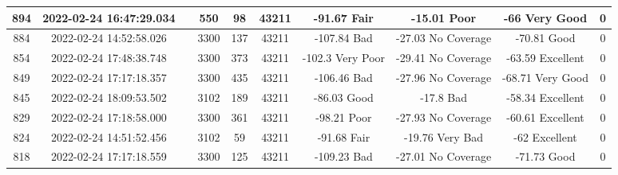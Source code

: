 \begin{longtable*}{|c|c|c|c|c|c|c|c|c|c|}
894&2022-02-24 16:47:29.034&&550&98&43211& -91.67    Fair        & -15.01    Poor        & -66       Very Good   & 0\\\hline
{}884&2022-02-24 14:52:58.026&&3300&137&43211& -107.84   Bad         & -27.03    No Coverage & -70.81    Good        & 0\\\hline
{}854&2022-02-24 17:48:38.748&&3300&373&43211& -102.3    Very Poor   & -29.41    No Coverage & -63.59    Excellent   & 0\\\hline
{}849&2022-02-24 17:17:18.357&&3300&435&43211& -106.46   Bad         & -27.96    No Coverage & -68.71    Very Good   & 0\\\hline
{}845&2022-02-24 18:09:53.502&&3102&189&43211& -86.03    Good        & -17.8     Bad         & -58.34    Excellent   & 0\\\hline
{}829&2022-02-24 17:18:58.000&&3300&361&43211& -98.21    Poor        & -27.93    No Coverage & -60.61    Excellent   & 0\\\hline
{}824&2022-02-24 14:51:52.456&&3102&59&43211& -91.68    Fair        & -19.76    Very Bad    & -62       Excellent   & 0\\\hline
{}818&2022-02-24 17:17:18.559&&3300&125&43211& -109.23   Bad         & -27.01    No Coverage & -71.73    Good        & 0\\\hline

\end{longtable*}

